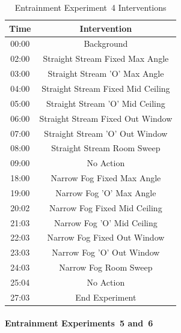 \documentclass[12pt,oneside]{book}
\begin{document}
\begin{table}[H]
	\centering
	\caption{Entrainment Experiment~4 Interventions}
	\begin{tabular}{|c|c|} 
		\hline
 		Time 	& 	Intervention 	\\ \hline \hline
 		00:00	&	Background 	\\ \hline
		02:00	&	Straight Stream Fixed Max Angle 	\\ \hline
		03:00	&	Straight Stream 'O' Max Angle 	\\ \hline
		04:00	&	Straight Stream Fixed Mid Ceiling 	\\ \hline
		05:00	&	Straight Stream 'O' Mid Ceiling 	\\ \hline
		06:00	&	Straight Stream Fixed Out Window 	\\ \hline
		07:00	&	Straight Stream 'O' Out Window 	\\ \hline
		08:00	&	Straight Stream Room Sweep 	\\ \hline
		09:00	&	No Action 	\\ \hline
		18:00	&	Narrow Fog Fixed Max Angle 	\\ \hline
		19:00	&	Narrow Fog 'O' Max Angle 	\\ \hline
		20:02	&	Narrow Fog Fixed Mid Ceiling 	\\ \hline
		21:03	&	Narrow Fog 'O' Mid Ceiling 	\\ \hline
		22:03	&	Narrow Fog Fixed Out Window 	\\ \hline
		23:03	&	Narrow Fog 'O' Out Window 	\\ \hline
		24:03	&	Narrow Fog Room Sweep 	\\ \hline
		25:04	&	No Action 	\\ \hline
		27:03	&	End Experiment 	\\ \hline
	\end{tabular}
	\label{Table:EntExp4_Interventions}
\end{table}

\FloatBarrier

\paragraph{Entrainment Experiments~5 and~6} \mbox{}

\end{document}
